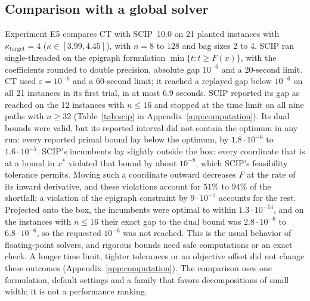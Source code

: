 \subsection{Comparison with a global solver}\label{sec:comp-scip}
Experiment E5 compares CT with SCIP~10.0
\cite{VigerskeGleixner2018,HojnyEtAl2025} on 21 planted instances with
$\kappa_{\mathrm{target}}=4$ ($\kappa\in[3.99,4.45]$), with $n=8$ to $128$ and
bag sizes 2 to 4. SCIP ran single-threaded on the epigraph formulation $\min\{t:t\ge F(x)\}$, with the coefficients rounded to
double precision, absolute gap $10^{-6}$ and a 20-second limit. CT used
$\varepsilon=10^{-6}$ and a 60-second limit; it reached a replayed gap below
$10^{-6}$ on all 21 instances in its first trial, in at most $6.9$ seconds.
SCIP reported its gap as reached on the 12 instances with $n\le16$ and stopped
at the time limit on all nine paths with $n\ge32$ (Table~\ref{tab:scip} in
Appendix~\ref{app:computation}). Its dual bounds were valid, but its reported
interval did not contain the optimum in any run: every reported primal bound
lay below the optimum, by $1.8\cdot10^{-6}$ to $1.6\cdot10^{-5}$. SCIP's
incumbents lay slightly outside the box: every coordinate that is at a bound
in $x^*$ violated that bound by about $10^{-8}$, which SCIP's feasibility
tolerance permits. Moving such a coordinate outward decreases $F$ at the rate
of its inward derivative, and these violations account for $51\%$ to $94\%$
of the shortfall; a violation of the epigraph constraint by $9\cdot10^{-7}$
accounts for the rest. Projected onto the box, the incumbents were optimal to within
$1.3\cdot10^{-14}$, and on the instances with $n\le16$ their exact gap to the
dual bound was $2.8\cdot10^{-6}$ to $6.8\cdot10^{-6}$, so the requested
$10^{-6}$ was not reached. This is the usual behavior of floating-point
solvers, and rigorous bounds need safe computations
\cite{NeumaierShcherbina2004} or an exact check. A longer time limit, tighter
tolerances or an objective offset did not change these outcomes
(Appendix~\ref{app:computation}). The comparison uses one formulation, default
settings and a family that favors decompositions of small width; it is not a
performance ranking.

